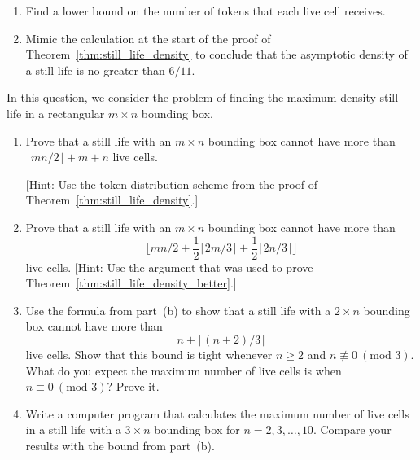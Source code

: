 \begin{multicols}{2}
\begin{problemstar}
\begin{enumerate}[label=\bf\color{ocre}(\alph*)]
			[Hint: Use Exercise~\ref{exer:still_lifes_6_neigh}.]
			
			\item Find a lower bound on the number of tokens that each live cell receives.
			
			\item Mimic the calculation at the start of the proof of Theorem~\ref{thm:still_life_density} to conclude that the asymptotic density of a still life is no greater than $6/11$.
		\end{enumerate}
	\end{problemstar}
	
	
	\mfilbreak
	
	
	\begin{problem}\label{exer:still_life_density_rectangle} 
		In this question, we consider the problem of finding the maximum density still life in a rectangular $m \times n$ bounding box.\smallskip
		
		\begin{enumerate}[label=\bf\color{ocre}(\alph*)]
			\item Prove that a still life with an $m \times n$ bounding box cannot have more than $\lfloor mn/2 \rfloor + m + n$ live cells.
			
			[Hint: Use the token distribution scheme from the proof of Theorem~\ref{thm:still_life_density}.]
			
			\item Prove that a still life with an $m \times n$ bounding box cannot have more than $$\Big\lfloor mn/2 + \frac{1}{2}\lceil 2m/3 \rceil + \frac{1}{2}\lceil 2n/3 \rceil \Big\rfloor$$ live cells. [Hint: Use the argument that was used to prove Theorem~\ref{thm:still_life_density_better}.]
			
			\item Use the formula from part~(b) to show that a still life with a $2 \times n$ bounding box cannot have more than
			$$
			n + \big\lceil(n+2)/3\big\rceil
			$$
			live cells. Show that this bound is tight whenever $n \geq 2$ and $n \not\equiv 0 \ (\text{mod } 3)$. What do you expect the maximum number of live cells is when $n \equiv 0 \ (\text{mod } 3)$? Prove it.
			
			\item Write a computer program that calculates the maximum number of live cells in a still life with a $3 \times n$ bounding box for $n = 2, 3, \ldots, 10$. Compare your results with the bound from part~(b).
		\end{enumerate}
	\end{problem}
	

\end{multicols}
